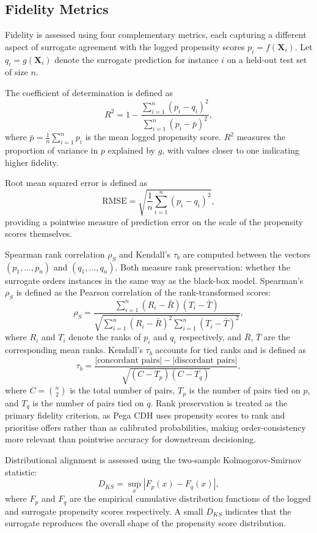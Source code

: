 \documentclass[oneside]{memoir} %
\begin{document}
\subsection{Fidelity Metrics}

Fidelity is assessed using four complementary metrics, each capturing a different aspect of surrogate agreement with the logged propensity scores $p_i = f(\mathbf{X}_i)$. Let $q_i = g(\mathbf{X}_i)$ denote the surrogate prediction for instance $i$ on a held-out test set of size $n$.

The coefficient of determination is defined as
\[
R^2 = 1 - \frac{\sum_{i=1}^{n}(p_i - q_i)^2}{\sum_{i=1}^{n}(p_i - \bar{p})^2},
\]
where $\bar{p} = \frac{1}{n}\sum_{i=1}^{n} p_i$ is the mean logged propensity score. $R^2$ measures the proportion of variance in $p$ explained by $g$, with values closer to one indicating higher fidelity.

Root mean squared error is defined as
\[
\text{RMSE} = \sqrt{\frac{1}{n}\sum_{i=1}^{n}(p_i - q_i)^2},
\]
providing a pointwise measure of prediction error on the scale of the propensity scores themselves.

Spearman rank correlation $\rho_S$ and Kendall's $\tau_b$ are computed between the vectors $(p_1, \ldots, p_n)$ and $(q_1, \ldots, q_n)$. Both measure rank preservation: whether the surrogate orders instances in the same way as the black-box model. Spearman's $\rho_S$ is defined as the Pearson correlation of the rank-transformed scores:
\[
\rho_S = \frac{\sum_{i=1}^{n}(R_i - \bar{R})(T_i - \bar{T})} {\sqrt{\sum_{i=1}^{n}(R_i - \bar{R})^2 \sum_{i=1}^{n}(T_i - \bar{T})^2}},
\]
where $R_i$ and $T_i$ denote the ranks of $p_i$ and $q_i$ respectively, and $\bar{R}$, $\bar{T}$ are the corresponding mean ranks. Kendall's $\tau_b$ accounts for tied ranks and is defined as
\[
\tau_b = \frac{|\text{concordant pairs}| - |\text{discordant pairs}|} {\sqrt{(C - T_p)(C - T_q)}},
\]
where $C = \binom{n}{2}$ is the total number of pairs, $T_p$ is the number of pairs tied on $p$, and $T_q$ is the number of pairs tied on $q$. Rank preservation is treated as the primary fidelity criterion, as Pega CDH uses propensity scores to rank and prioritise offers rather than as calibrated probabilities, making order-consistency more relevant than pointwise accuracy for downstream decisioning.

Distributional alignment is assessed using the two-sample Kolmogorov-Smirnov statistic:
\[
D_{KS} = \sup_{x} \left| F_p(x) - F_q(x) \right|,
\]
where $F_p$ and $F_q$ are the empirical cumulative distribution functions of the logged and surrogate propensity scores respectively. A small $D_{KS}$ indicates that the surrogate reproduces the overall shape of the propensity score distribution.
\end{document}
